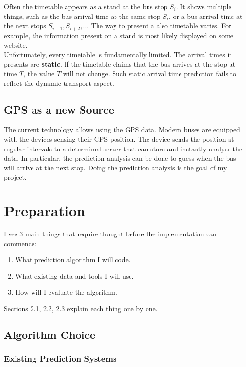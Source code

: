 \documentclass[12pt,a4paper,oneside,openright]{report}
\begin{document}
Often the timetable appears as a stand at the bus stop $S_i$. It shows multiple
things, such as the bus arrival time at the same stop $S_i$, or a bus arrival time
at the next stops $S_{i+1}, S_{i+2}, ...$ The way to present a also timetable varies.
For example, the information present on a stand is most likely displayed on some website. \\

Unfortunately, every timetable is fundamentally limited. The arrival times it presents
are \textbf{static}. If the timetable claims that the bus arrives at the stop at
time $T$, the value $T$ will not change. Such static arrival time prediction fails to
reflect the dynamic transport aspect. \\

\section{GPS as a new Source}

The current technology allows using the GPS data. Modern buses are equipped
with the devices sensing their GPS position. The device sends the position at regular
intervals to a determined server that can store and instantly analyse the data. In
particular, the prediction analysis can be done to guess when the bus will arrive at
the next stop. Doing the prediction analysis is the goal of my project.


\chapter{Preparation}

I see 3 main things that require thought before the implementation can commence:

\begin{enumerate}
\item What prediction algorithm I will code.
\item What existing data and tools I will use.
\item How will I evaluate the algorithm.
\end{enumerate}

Sections 2.1, 2.2, 2.3 explain each thing one by one.

\section{Algorithm Choice}

\subsection{Existing Prediction Systems}
\end{document}
